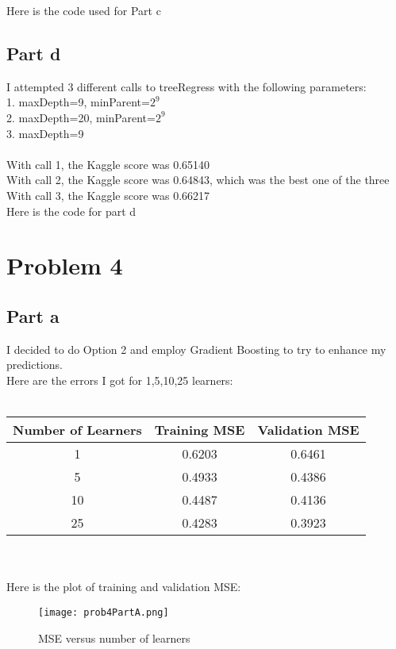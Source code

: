 \documentclass[twoside,11pt]{article}
\theoremstyle{definition}
\begin{document}
\newpage

Here is the code used for Part c\\


\newpage

\subsection*{Part d}

I attempted 3 different calls to treeRegress with the following parameters:\\
1. maxDepth=9, minParent=$2^9$\\
2. maxDepth=20, minParent=$2^9$\\
3. maxDepth=9\\
\\
With call 1, the Kaggle score was 0.65140\\
With call 2, the Kaggle score was 0.64843, which was the best one of the three\\
With call 3, the Kaggle score was 0.66217\\

Here is the code for part d\\


\newpage

\section*{Problem 4}

\subsection*{Part a}

I decided to do Option 2 and employ Gradient Boosting to try to enhance my predictions. \\
Here are the errors I got for 1,5,10,25 learners: \\
\\
\begin{tabular}{ c | c | c }
  Number of Learners & Training MSE & Validation MSE\\
  \hline                       
  1 & 0.6203 & 0.6461 \\
  5 & 0.4933 & 0.4386\\
  10 & 0.4487 & 0.4136\\
  25 & 0.4283 & 0.3923\\
\end{tabular}
\\
\\
Here is the plot of training and validation MSE:\\
\begin{figure}[h]
\centering
\texttt{[image: prob4PartA.png]}
\caption{MSE versus number of learners}
\end{figure}
\end{document}
